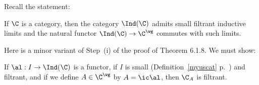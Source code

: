 \documentclass[12pt]{article}
\theoremstyle{remark}
\theoremstyle{definition}
\begin{document}


Recall the statement:

\begin{thm}[Theorem 6.1.8 p.~132]
If $\C$ is a category, then the category $\Ind(\C)$ admits small filtrant inductive limits and the natural functor $\Ind(\C)\to\C^\wg$ commutes with such limits.
\end{thm}



Here is a minor variant of Step~(i) of the proof of Theorem 6.1.8. We must show:  

\begin{lem} 
If $\al:I\to\Ind(\C)$ is a functor, if $I$ is small (Definition~\ref{myuscat} p.~) and filtrant, and if we define $A\in\C^\wg$ by $A=\ic\al$, then $\C_A$ is filtrant. 
\end{lem} 
\end{document}
